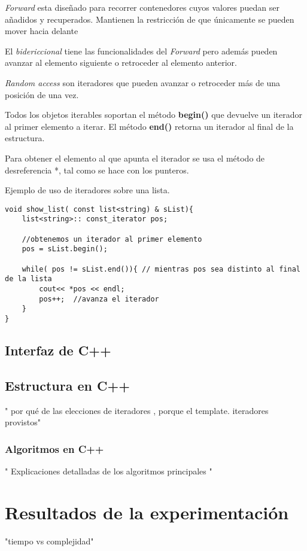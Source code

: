 \documentclass[a4paper,12pt]{article}
\begin{document}
 \emph{Forward} esta diseñado para recorrer contenedores cuyos valores puedan ser añadidos y recuperados. Mantienen la restricción de que únicamente se pueden mover hacia delante

El  \emph{bidericcional}  tiene las funcionalidades del \emph{Forward} pero además  pueden avanzar al elemento siguiente o retroceder al elemento anterior.

\emph{Random access} son iteradores que pueden avanzar o retroceder más de una posición de una vez.

Todos los objetos iterables soportan el método \textbf{begin()} que devuelve un iterador al primer elemento a iterar.
El método \textbf{end()} retorna un iterador al final de la estructura. 

Para obtener el elemento al que apunta el iterador se usa el método de desreferencia *, tal como se hace con los punteros.

Ejemplo de uso de iteradores sobre una lista.



\lstset{language=C, breaklines=true, basicstyle=\footnotesize}
\begin{lstlisting}[frame=single]
void show_list( const list<string) & sList){
	list<string>:: const_iterator pos;
    
    //obtenemos un iterador al primer elemento
    pos = sList.begin();
    
    while( pos != sList.end()){ // mientras pos sea distinto al final de la lista
    	cout<< *pos << endl;
        pos++;  //avanza el iterador
    }
}
\end{lstlisting}



\subsection{Interfaz de C++}



\subsection{Estructura en C++}
" por qué de las elecciones de iteradores , porque el template.
iteradores provistos"


\subsubsection{Algoritmos en C++}
" Explicaciones detalladas de los algoritmos principales "


\section{Resultados de la experimentación}
\label{sec5}
"tiempo vs complejidad"
\end{document}
